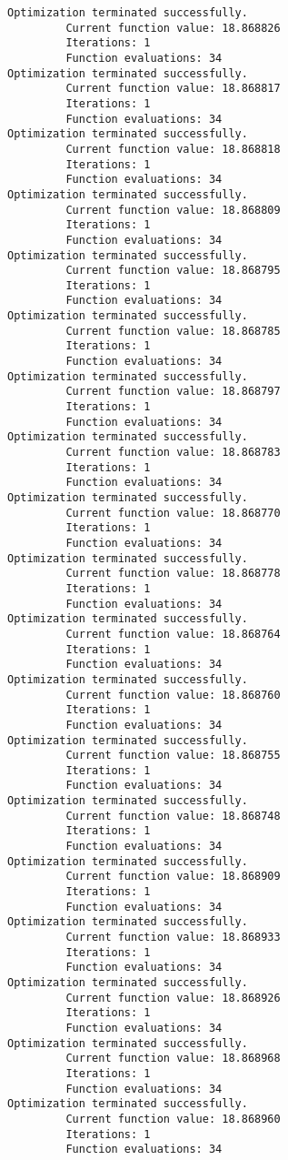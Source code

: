 \documentclass[11pt]{article}
\begin{document}
\begin{Verbatim}[commandchars=\\\{\}]
Optimization terminated successfully.
         Current function value: 18.868826
         Iterations: 1
         Function evaluations: 34
Optimization terminated successfully.
         Current function value: 18.868817
         Iterations: 1
         Function evaluations: 34
Optimization terminated successfully.
         Current function value: 18.868818
         Iterations: 1
         Function evaluations: 34
Optimization terminated successfully.
         Current function value: 18.868809
         Iterations: 1
         Function evaluations: 34
Optimization terminated successfully.
         Current function value: 18.868795
         Iterations: 1
         Function evaluations: 34
Optimization terminated successfully.
         Current function value: 18.868785
         Iterations: 1
         Function evaluations: 34
Optimization terminated successfully.
         Current function value: 18.868797
         Iterations: 1
         Function evaluations: 34
Optimization terminated successfully.
         Current function value: 18.868783
         Iterations: 1
         Function evaluations: 34
Optimization terminated successfully.
         Current function value: 18.868770
         Iterations: 1
         Function evaluations: 34
Optimization terminated successfully.
         Current function value: 18.868778
         Iterations: 1
         Function evaluations: 34
Optimization terminated successfully.
         Current function value: 18.868764
         Iterations: 1
         Function evaluations: 34
Optimization terminated successfully.
         Current function value: 18.868760
         Iterations: 1
         Function evaluations: 34
Optimization terminated successfully.
         Current function value: 18.868755
         Iterations: 1
         Function evaluations: 34
Optimization terminated successfully.
         Current function value: 18.868748
         Iterations: 1
         Function evaluations: 34
Optimization terminated successfully.
         Current function value: 18.868909
         Iterations: 1
         Function evaluations: 34
Optimization terminated successfully.
         Current function value: 18.868933
         Iterations: 1
         Function evaluations: 34
Optimization terminated successfully.
         Current function value: 18.868926
         Iterations: 1
         Function evaluations: 34
Optimization terminated successfully.
         Current function value: 18.868968
         Iterations: 1
         Function evaluations: 34
Optimization terminated successfully.
         Current function value: 18.868960
         Iterations: 1
         Function evaluations: 34

\end{Verbatim}
\end{document}
